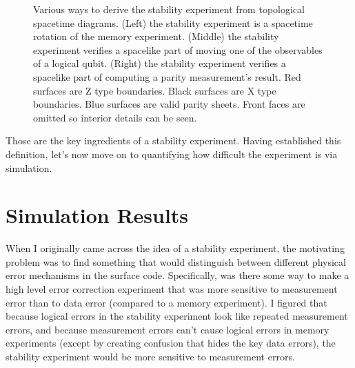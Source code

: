 \documentclass[onecolumn,unpublished,a4paper]{quantumarticle}
\theoremstyle{definition}
\theoremstyle{definition}
\theoremstyle{definition}
\begin{document}
\begin{figure}
    \centering
    \caption{
        Various ways to derive the stability experiment from topological spacetime diagrams.
        (Left) the stability experiment is a spacetime rotation of the memory experiment.
        (Middle) the stability experiment verifies a spacelike part of moving one of the observables of a logical qubit.
        (Right) the stability experiment verifies a spacelike part of computing a parity measurement's result.
        Red surfaces are Z type boundaries.
        Black surfaces are X type boundaries.
        Blue surfaces are valid parity sheets.
        Front faces are omitted so interior details can be seen.
    }
    \label{fig:topological}
\end{figure}

Those are the key ingredients of a stability experiment.
Having established this definition, let's now move on to quantifying how difficult the experiment is via simulation.

\section{Simulation Results}

When I originally came across the idea of a stability experiment, the motivating problem was to find something that would distinguish between different physical error mechanisms in the surface code.
Specifically, was there some way to make a high level error correction experiment that was more sensitive to measurement error than to data error (compared to a memory experiment).
I figured that because logical errors in the stability experiment look like repeated measurement errors, and because measurement errors can't cause logical errors in memory experiments (except by creating confusion that hides the key data errors), the stability experiment would be more sensitive to measurement errors.
\end{document}
